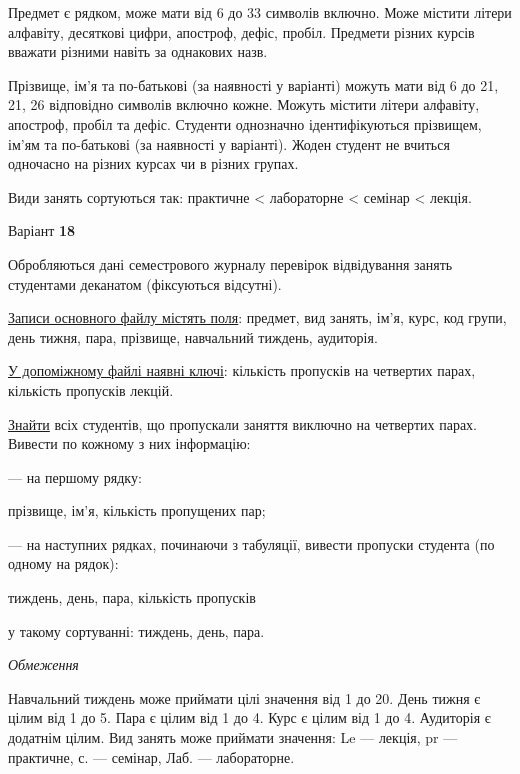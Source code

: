 \documentclass[11pt, ukrainian]{article}
\begin{document}
Предмет є рядком, може мати від 6 до 33 символів включно.
Може містити літери алфавіту, десяткові цифри, апостроф, дефіс, пробіл.
Предмети різних курсів вважати різними навіть за однакових назв.

Прізвище, ім’я та по-батькові (за наявності у варіанті)
можуть мати від 6 до 21, 21, 26 відповідно символів включно кожне.
Можуть містити літери алфавіту, апостроф, пробіл та дефіс.
Студенти однозначно ідентифікуються прізвищем, ім’ям та по-батькові (за наявності у варіанті).
Жоден студент не вчиться одночасно на різних курсах чи в різних групах.

Види занять сортуються так: практичне < лабораторне < семінар < лекція.



\par
\newpage
{\center Варіант  \No \textbf { 18 }\par}
\bigskip
Обробляються дані семестрового журналу перевірок відвідування занять студентами деканатом (фіксуються відсутні). 

\underline{Записи основного файлу містять поля}: предмет, вид занять, ім’я, курс, код групи, день тижня, пара, прізвище, навчальний тиждень, аудиторія.

\underline{У допоміжному файлі наявні ключі}: кількість пропусків на четвертих парах, кількість пропусків лекцій.

\underline{Знайти} всіх студентів, що пропускали заняття виключно на четвертих парах. Вивести по кожному з них інформацію:\par
{\noindent}--- на першому рядку:\par
прізвище, ім’я, кількість пропущених пар;

{\noindent}--- на наступних рядках, починаючи з табуляції, вивести пропуски студента (по одному на рядок):\par
тиждень, день, пара, кількість пропусків

{\noindent}у такому сортуванні: тиждень, день, пара.


\bigskip\textit{Обмеження}

Навчальний тиждень може приймати цілі значення від 1 до 20.
День тижня є цілим від 1 до 5. Пара є цілим від 1 до 4.
Курс є цілим від 1 до 4. Аудиторія є додатнім цілим.
Вид занять може приймати значення:
Le --- лекція, pr --- практичне, с. --- семінар, Лаб. --- лабораторне.
\end{document}
